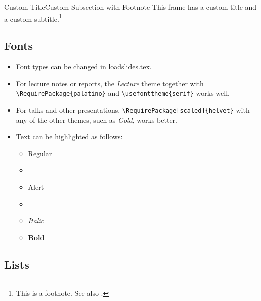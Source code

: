 \documentclass[
11pt,notheorems,hyperref={pdfauthor=whatever}
]{beamer}
\begin{document}
\begin{frame}{Custom Title}{Custom Subsection with Footnote}
    This frame has a custom title and a custom subtitle.\footnote{This is a footnote. See also \citet{example_2022}. }
\end{frame}

\subsection{Fonts}
\begin{frame}[fragile]
\begin{itemize}
\item Font types can be changed in loadslides.tex.
    \item For lecture notes or reports, the \textit{Lecture} theme together with \verb +\RequirePackage{palatino}+ and \verb+\usefonttheme{serif}+ works well. 
    \item For talks and other presentations, \verb+\RequirePackage[scaled]{helvet}+ with any of the other themes, such as \textit{Gold}, works better.
    \item Text can be highlighted as follows:
    \begin{itemize}
        \item Regular
        \item {}
        \item \alert{Alert}
        \item {}
        \item \textit{Italic}
        \item \textbf{Bold}
    \end{itemize}
\end{itemize}
    
\end{frame}

\subsection{Lists}
\end{document}
